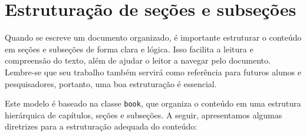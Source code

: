 \section{Estruturação de seções e subseções}\label{sec:secoes-desenvolvimento}

Quando se escreve um documento organizado, é importante estruturar o conteúdo em seções e subseções
de forma clara e lógica. Isso facilita a leitura e compreensão do texto, além de ajudar o leitor a
navegar pelo documento. Lembre-se que seu trabalho também servirá como referência para futuros
alunos e pesquisadores, portanto, uma boa estruturação é essencial.

Este modelo é baseado na classe \texttt{book}, que organiza o conteúdo em uma estrutura hierárquica
de capítulos, seções e subseções. A seguir, apresentamos algumas diretrizes para a estruturação
adequada do conteúdo:

